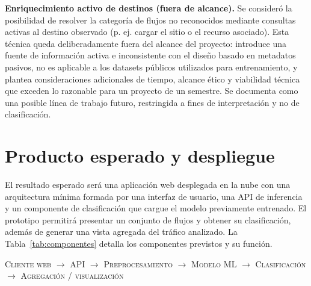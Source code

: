 \documentclass[conference]{IEEEtran}
\begin{document}
\textbf{Enriquecimiento activo de destinos (fuera de alcance).} Se consideró la posibilidad de resolver la categoría de flujos no reconocidos mediante consultas activas al destino observado (p. ej. cargar el sitio o el recurso asociado). Esta técnica queda deliberadamente fuera del alcance del proyecto: introduce una fuente de información activa e inconsistente con el diseño basado en metadatos pasivos, no es aplicable a los datasets públicos utilizados para entrenamiento, y plantea consideraciones adicionales de tiempo, alcance ético y viabilidad técnica que exceden lo razonable para un proyecto de un semestre. Se documenta como una posible línea de trabajo futuro, restringida a fines de interpretación y no de clasificación.

\section{Producto esperado y despliegue}

El resultado esperado será una aplicación web desplegada en la nube con una arquitectura mínima formada por una interfaz de usuario, una API de inferencia y un componente de clasificación que cargue el modelo previamente entrenado. El prototipo permitirá presentar un conjunto de flujos y obtener su clasificación, además de generar una vista agregada del tráfico analizado. La Tabla~\ref{tab:componentes} detalla los componentes previstos y su función.

\begin{center}
\small
\textsc{Cliente web} $\rightarrow$ \textsc{API} $\rightarrow$ \textsc{Preprocesamiento} $\rightarrow$ \textsc{Modelo ML} $\rightarrow$ \textsc{Clasificación} $\rightarrow$ \textsc{Agregación / visualización}
\end{center}



\end{document}
